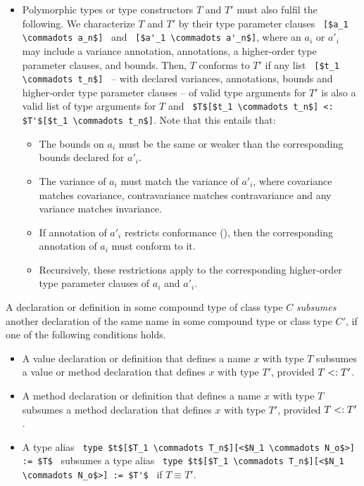 \begin{itemize}
\item
Polymorphic types or type constructors $T$ and $T'$ must also fulfil the following. We characterize $T$ and $T'$ by their type parameter clauses ~\lstinline![$a_1 \commadots a_n$]!~ and ~\lstinline![$a'_1 \commadots a'_n$]!, where an $a_i$ or $a'_i$ may include a variance annotation, annotations, a higher-order type parameter clauses, and bounds. Then, $T$ conforms to $T'$ if any list ~\lstinline![$t_1 \commadots t_n$]!~ -- with declared variances, annotations, bounds and higher-order type parameter clauses -- of valid type arguments for $T'$ is also a valid list of type arguments for $T$ and ~\lstinline!$T$[$t_1 \commadots t_n$] <: $T'$[$t_1 \commadots t_n$]!. Note that this entails that:
\begin{itemize}
\item The bounds on $a_i$ must be the same or weaker than the corresponding bounds declared for $a'_i$. 
\item The variance of $a_i$ must match the variance of $a'_i$, where covariance matches covariance, contravariance matches contravariance and any variance matches invariance. 
\item If annotation of $a'_i$ restricts conformance (), then the corresponding annotation of $a_i$ must conform to it. 
\item Recursively, these restrictions apply to the corresponding higher-order type parameter clauses of $a_i$ and $a'_i$. 
\end{itemize}

\end{itemize}

A declaration or definition in some compound type of class type $C$ {\em subsumes} another declaration of the same name in some compound type or class type $C'$, if one of the following conditions holds. 
\begin{itemize}
\item A value declaration or definition that defines a name $x$ with type $T$ subsumes a value or method declaration that defines $x$ with type $T'$, provided $T <: T'$. 
\item A method declaration or definition that defines a name $x$ with type $T$ subsumes a method declaration that defines $x$ with type $T'$, provided $T <: T'$. 
\item A type alias ~\lstinline!type $t$[$T_1 \commadots T_n$][<$N_1 \commadots N_o$>] := $T$!~ subsumes a type alias ~\lstinline!type $t$[$T_1 \commadots T_n$][<$N_1 \commadots N_o$>] := $T'$!~ if $T \equiv T'$. 
\end{itemize}





